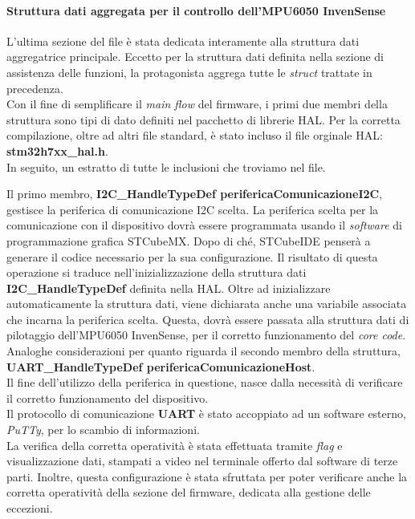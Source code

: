 \paragraph{Struttura dati aggregata per il controllo dell'MPU6050 InvenSense}
L'ultima sezione del file è stata dedicata interamente alla struttura dati aggregatrice principale. Eccetto per la struttura dati definita nella sezione di assistenza delle funzioni, la protagonista aggrega tutte le \textit{struct} trattate in precedenza.\\
Con il fine di semplificare il \textit{main flow} del firmware, i primi due membri della struttura sono tipi di dato definiti nel pacchetto di librerie HAL. Per la corretta compilazione, oltre ad altri file standard,  è stato incluso il file orginale HAL: \textbf{stm32h7xx\_hal.h}.\\
In seguito, un estratto di tutte le inclusioni che troviamo nel file.

Il primo membro, \textbf{I2C\_HandleTypeDef perifericaComunicazioneI2C}, gestisce la periferica di comunicazione I2C scelta. La periferica scelta per la comunicazione con il dispositivo dovrà essere programmata usando il \textit{software} di programmazione grafica STCubeMX.
Dopo di ché, STCubeIDE penserà a generare il codice necessario per la sua configurazione. Il risultato di questa operazione si traduce nell'inizializzazione della struttura dati \textbf{I2C\_HandleTypeDef} definita nella HAL. Oltre ad inizializzare automaticamente la struttura dati, viene dichiarata anche una variabile associata
che incarna la periferica scelta. Questa, dovrà essere passata alla struttura dati di pilotaggio dell'MPU6050 InvenSense, per il corretto funzionamento del \textit{core code}.
Analoghe considerazioni per quanto riguarda il secondo membro della struttura, \textbf{UART\_HandleTypeDef perifericaComunicazioneHost}. 
\\Il fine dell'utilizzo della periferica in questione, nasce dalla necessità di verificare il corretto funzionamento del dispositivo.\\
Il protocollo di comunicazione \textbf{UART} è stato accoppiato ad un software esterno, \textit{PuTTy}, per lo scambio di informazioni.\\
La verifica della corretta operatività è stata effettuata tramite \textit{flag} e visualizzazione dati, stampati a video nel terminale offerto dal software di terze parti. Inoltre, questa configurazione è stata sfruttata per poter verificare anche la corretta operatività della sezione del firmware, dedicata alla gestione delle eccezioni.\\
